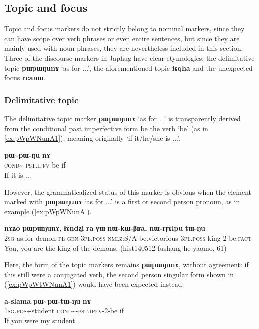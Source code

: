 \documentclass[oldfontcommands,oneside,a4paper,11pt]{article}
\newcommand{\ipa}[1]{\mbox{\phon\textbf{#1}}} %
\newcommand{\tld}{\textasciitilde{}}
\begin{document}
   \subsection{Topic and focus} \label{sec:topic}
Topic and focus markers do not strictly belong to nominal markers, since they can have scope over verb phrases or even entire sentences, but since they are mainly used with noun phrases, they are nevertheless included in this section. Three of the discourse markers in Japhug have clear etymologies: the delimitative topic \ipa{pɯpɯŋunɤ} `as for ...', the aforementioned topic \ipa{iɕqha} and the unexpected focus \ipa{rcanɯ}.

  \subsubsection{Delimitative topic}
The delimitative topic marker \ipa{pɯpɯŋunɤ} `as for ...' is transparently derived from the conditional past imperfective form be the verb `be' (as in \ref{ex:pWpWNunA1}), meaning originally `if it/he/she is ...'.

\begin{exe}
\ex \label{ex:pWpWNunA1}
\gll \ipa{pɯ\tld{}pɯ-ŋu} \ipa{nɤ} \\
\textsc{cond}\tld{}-\textsc{pst.ipfv}-be if \\
\glt If it is ...
\end{exe}

However, the grammaticalized status of this marker is obvious when the element marked with \ipa{pɯpɯŋunɤ} `as for ...' is a first or second person pronoun, as in example (\ref{ex:pWpWNunA}).

\begin{exe}
\ex \label{ex:pWpWNunA}
\gll \ipa{nɤʑo}	\ipa{pɯpɯŋunɤ,}	\ipa{ɬɤndʐi}	\ipa{ra}	\ipa{ɣɯ}	\ipa{nɯ-kɯ-βʁa,}	\ipa{nɯ-rɟɤlpu}	\ipa{tɯ-ŋu} \\
\textsc{2sg} as.for demon \textsc{pl} \textsc{gen} \textsc{3pl.poss}-\textsc{nmlz}:S/A-be.victorious \textsc{3pl.poss}-king 2-be:\textsc{fact} \\
\glt You, you are the king of the demons. (hist140512 fushang he yaomo, 61)
\end{exe}
Here, the form of the topic markers remains \ipa{pɯpɯŋunɤ}, without agreement: if this still were a conjugated verb, the second person singular form shown in (\ref{ex:pWpWtWNunA1}) would have been expected instead.

\begin{exe}
\ex \label{ex:pWpWtWNunA1}
\gll \ipa{a-slama} \ipa{pɯ\tld{}pɯ-tɯ-ŋu} \ipa{nɤ} \\
\textsc{1sg.poss}-student \textsc{cond}\tld{}-\textsc{pst.ipfv}-2-be if \\
\glt If you were my student...
\end{exe}
\end{document}
